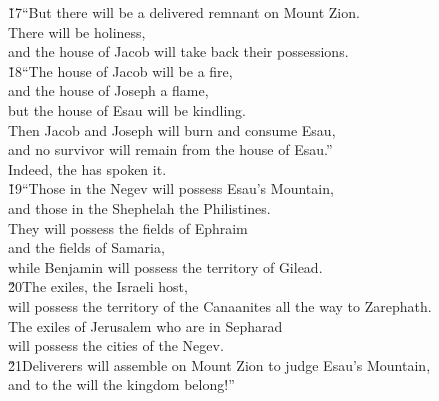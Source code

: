 \begin{poetry}
\poeml \v{17}``But there will be a delivered remnant on Mount Zion. \\
\poemll    There will be holiness, \\
\poemlll       and the house of Jacob will take back their possessions. \\
\poeml \v{18}``The house of Jacob will be a fire, \\
\poeml and the house of Joseph a flame, \\
\poemll    but the house of Esau will be kindling. \\
\poeml Then Jacob and Joseph will burn and consume Esau, \\
\poemll    and no survivor will remain from the house of Esau.'' \\
\poeml Indeed, the  has spoken it. \\
\poeml \v{19}``Those in the Negev will possess Esau's Mountain, \\
\poemll    and those in the Shephelah the Philistines. \\
\poeml They will possess the fields of Ephraim \\
\poemll    and the fields of Samaria, \\
\poeml while Benjamin will possess the territory of Gilead. \\
\poeml \v{20}The exiles, the Israeli host, \\
\poemll    will possess the territory of the Canaanites all the way to Zarephath. \\
\poeml The exiles of Jerusalem who are in Sepharad \\
\poemll    will possess the cities of the Negev. \\
\poeml \v{21}Deliverers will assemble on Mount Zion to judge Esau's Mountain, \\
\poemll    and to the  will the kingdom belong!''\end{poetry}
